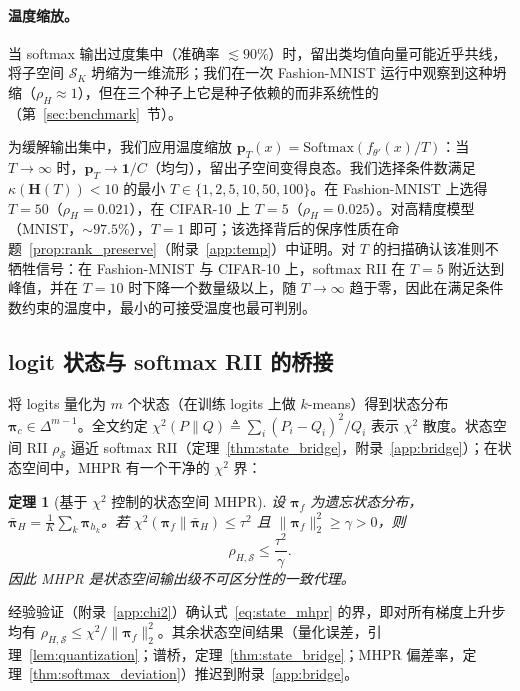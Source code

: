 \documentclass[11pt,a4paper]{article}
\newtheorem{theorem}{定理}[section]
\newcommand{\coloneqq}{\triangleq}
\begin{document}
\paragraph{温度缩放。}
当 softmax 输出过度集中（准确率 $\lesssim 90\%$）时，留出类均值向量可能近乎共线，将子空间 $\mathcal{S}_K$ 坍缩为一维流形；我们在一次 Fashion-MNIST 运行中观察到这种坍缩（$\rho_H\approx1$），但在三个种子上它是种子依赖的而非系统性的（第~\ref{sec:benchmark}~节）。

为缓解输出集中，我们应用温度缩放 $\mathbf{p}_T(x) = \mathrm{Softmax}(f_{\theta'}(x)/T)$：当 $T\to\infty$ 时，$\mathbf{p}_T \to \mathbf{1}/C$（均匀），留出子空间变得良态。我们选择条件数满足 $\kappa(\mathbf{H}(T)) < 10$ 的最小 $T\in\{1,2,5,10,50,100\}$。在 Fashion-MNIST 上选得 $T=50$（$\rho_H = 0.021$），在 CIFAR-10 上 $T=5$（$\rho_H = 0.025$）。对高精度模型（MNIST，$\sim97.5\%$），$T=1$ 即可；该选择背后的保序性质在命题~\ref{prop:rank_preserve}（附录~\ref{app:temp}）中证明。对 $T$ 的扫描确认该准则不牺牲信号：在 Fashion-MNIST 与 CIFAR-10 上，softmax RII 在 $T{=}5$ 附近达到峰值，并在 $T{=}10$ 时下降一个数量级以上，随 $T\to\infty$ 趋于零，因此在满足条件数约束的温度中，最小的可接受温度也最可判别。

\subsection{logit 状态与 softmax RII 的桥接}
\label{sec:logit_bridge}

将 logits 量化为 $m$ 个状态（在训练 logits 上做 $k$-means）得到状态分布 $\boldsymbol{\pi}_c\in\Delta^{m-1}$。全文约定 $\chi^2(P\|Q)\coloneqq\sum_i (P_i-Q_i)^2/Q_i$ 表示 $\chi^2$ 散度。状态空间 RII $\rho_{\mathcal{S}}$ 逼近 softmax RII（定理~\ref{thm:state_bridge}，附录~\ref{app:bridge}）；在状态空间中，MHPR 有一个干净的 $\chi^2$ 界：

\begin{theorem}[基于 $\chi^2$ 控制的状态空间 MHPR]
\label{thm:state_mhpr}
设 $\boldsymbol{\pi}_f$ 为遗忘状态分布，$\bar{\boldsymbol{\pi}}_H = \frac{1}{K}\sum_k \boldsymbol{\pi}_{h_k}$。若 $\chi^2(\boldsymbol{\pi}_f \| \bar{\boldsymbol{\pi}}_H) \le \tau^2$ 且 $\|\boldsymbol{\pi}_f\|_2^2 \ge \gamma > 0$，则
\begin{equation}
\rho_{H,\mathcal{S}} \le \frac{\tau^2}{\gamma}.
\label{eq:state_mhpr}
\end{equation}
因此 MHPR 是状态空间输出级不可区分性的一致代理。
\end{theorem}

经验验证（附录~\ref{app:chi2}）确认式~\eqref{eq:state_mhpr} 的界，即对所有梯度上升步均有 $\rho_{H,\mathcal{S}} \le \chi^2/\|\boldsymbol{\pi}_f\|_2^2$。其余状态空间结果（量化误差，引理~\ref{lem:quantization}；谱桥，定理~\ref{thm:state_bridge}；MHPR 偏差率，定理~\ref{thm:softmax_deviation}）推迟到附录~\ref{app:bridge}。
\end{document}
